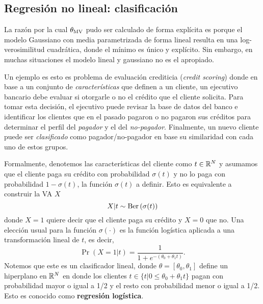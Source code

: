 
\subsection{Regresión no lineal: clasificación} 
\label{sub:clasif}

La razón por la cual ${\theta_\text{MV}}$ pudo ser calculado de forma explícita es porque el modelo Gaussiano con media parametrizada de forma lineal resulta en una log-verosimilitud cuadrática, donde el mínimo es único y explícito. Sin embargo, en muchas situaciones el modelo lineal y gaussiano no es el apropiado. 

Un ejemplo es esto es problema de evaluación crediticia (\textit{credit scoring}) donde en base a un conjunto de \textit{características} que definen a un cliente, un ejecutivo bancario debe evaluar si otorgarle o no el crédito que el cliente solicita. Para tomar esta decisión, el ejecutivo puede revisar la base de datos del banco e identificar los clientes que en el pasado pagaron o no pagaron sus créditos para determinar el perfil del \textit{pagador} y el del \textit{no-pagador}. Finalmente, un nuevo cliente puede ser \textit{clasificado} como pagador/no-pagador en base su similaridad con cada uno de estos grupos. 

Formalmente, denotemos las características del cliente como $t\in{\mathbb R}^N$ y asumamos que el cliente paga su crédito con probabilidad $\sigma(t)$ y no lo paga con probabilidad $1- \sigma(t)$, la función $\sigma(t)$ a definir. Esto es equivalente a construir la VA $X$
\begin{equation}
 	X|t \sim \text{Ber}\left(\sigma(t)\right)
 \end{equation} 
 donde $X=1$ quiere decir que el cliente paga su crédito y $X=0$ que no. Una elección usual para la función $\sigma(\cdot)$ es la función logística aplicada a una transformación lineal de $t$, es decir, 
 \begin{equation}
 	\Pr{(X=1|t)} = \frac{1}{1+e^{-(\theta_0 + \theta_1 t)	}}.
 \end{equation}
Notemos que este es un clasificador lineal, donde $\theta = [\theta_0, \theta_1]$ define un hiperplano en ${\mathbb R}^N$ en donde los clientes $t\in\{t | 0\leq \theta_0 + \theta_1 t\}$ pagan con probabilidad mayor o igual a 1/2 y el resto con probabilidad menor o igual a 1/2. Esto es conocido como \textbf{regresión logística}. 

